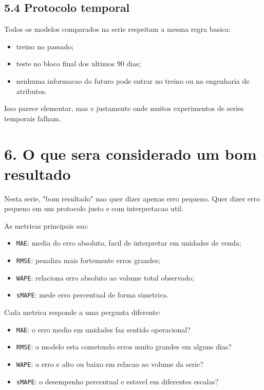 \documentclass[12pt]{article}
\providecommand{\tightlist}{%
  \setlength{\itemsep}{0pt}\setlength{\parskip}{0pt}}
\begin{document}
\subsection{5.4 Protocolo temporal}\label{54-protocolo-temporal}

Todos os modelos comparados na serie respeitam a mesma regra basica:

\begin{itemize}
\tightlist
\item
  treino no passado;
\item
  teste no bloco final dos ultimos 90 dias;
\item
  nenhuma informacao do futuro pode entrar no treino ou na engenharia de atributos.
\end{itemize}

Isso parece elementar, mas e justamente onde muitos experimentos de series temporais falham.

\section{6. O que sera considerado um bom resultado}\label{6-o-que-sera-considerado-um-bom-resultado}

Nesta serie, "bom resultado" nao quer dizer apenas erro pequeno. Quer dizer erro pequeno em um protocolo justo e com interpretacao util.

As metricas principais sao:

\begin{itemize}
\tightlist
\item
  \texttt{MAE}: media do erro absoluto, facil de interpretar em unidades de venda;
\item
  \texttt{RMSE}: penaliza mais fortemente erros grandes;
\item
  \texttt{WAPE}: relaciona erro absoluto ao volume total observado;
\item
  \texttt{sMAPE}: mede erro percentual de forma simetrica.
\end{itemize}

Cada metrica responde a uma pergunta diferente:

\begin{itemize}
\tightlist
\item
  \texttt{MAE}: o erro medio em unidades faz sentido operacional?
\item
  \texttt{RMSE}: o modelo esta cometendo erros muito grandes em alguns dias?
\item
  \texttt{WAPE}: o erro e alto ou baixo em relacao ao volume da serie?
\item
  \texttt{sMAPE}: o desempenho percentual e estavel em diferentes escalas?
\end{itemize}
\end{document}
